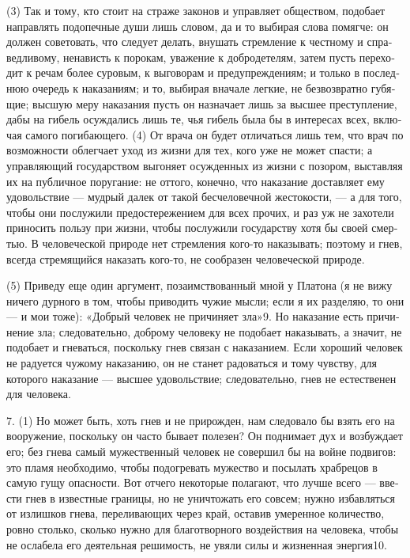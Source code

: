 (3) Так и тому, кто сто­ит на стра­же зако­нов и управ­ля­ет обще­ст­вом, подо­ба­ет направ­лять под­опеч­ные души лишь сло­вом, да и то выби­рая сло­ва помяг­че: он дол­жен сове­то­вать, что сле­ду­ет делать, вну­шать стрем­ле­ние к чест­но­му и спра­вед­ли­во­му, нена­висть к поро­кам, ува­же­ние к доб­ро­де­те­лям, затем пусть пере­хо­дит к речам более суро­вым, к выго­во­рам и пред­у­преж­де­ни­ям; и толь­ко в послед­нюю оче­редь к нака­за­ни­ям; и то, выби­рая вна­ча­ле лег­кие, не без­воз­врат­но губя­щие; выс­шую меру нака­за­ния пусть он назна­ча­ет лишь за выс­шее пре­ступ­ле­ние, дабы на гибель осуж­да­лись лишь те, чья гибель была бы в инте­ре­сах всех, вклю­чая само­го поги­баю­ще­го. (4) От вра­ча он будет отли­чать­ся лишь тем, что врач по воз­мож­но­сти облег­ча­ет уход из жиз­ни для тех, кого уже не может спа­сти; а управ­ля­ю­щий государ­ст­вом выго­ня­ет осуж­ден­ных из жиз­ни с позо­ром, выстав­ляя их на пуб­лич­ное пору­га­ние: не отто­го, конеч­но, что нака­за­ние достав­ля­ет ему удо­воль­ст­вие --- муд­рый далек от такой бес­че­ло­веч­ной жесто­ко­сти, --- а для того, чтобы они послу­жи­ли пре­до­сте­ре­же­ни­ем для всех про­чих, и раз уж не захо­те­ли при­но­сить поль­зу при жиз­ни, чтобы послу­жи­ли государ­ству хотя бы сво­ей смер­тью. В чело­ве­че­ской при­ро­де нет стрем­ле­ния кого-то нака­зы­вать; поэто­му и гнев, все­гда стре­мя­щий­ся нака­зать кого-то, не сооб­ра­зен чело­ве­че­ской при­ро­де.

(5) При­ве­ду еще один аргу­мент, поза­им­ст­во­ван­ный мной у Пла­то­на (я не вижу ниче­го дур­но­го в том, чтобы при­во­дить чужие мыс­ли; если я их разде­ляю, то они --- и мои тоже): «Доб­рый чело­век не при­чи­ня­ет зла»9. Но нака­за­ние есть при­чи­не­ние зла; сле­до­ва­тель­но, доб­ро­му чело­ве­ку не подо­ба­ет нака­зы­вать, а зна­чит, не подо­ба­ет и гне­вать­ся, посколь­ку гнев свя­зан с нака­за­ни­ем. Если хоро­ший чело­век не раду­ет­ся чужо­му нака­за­нию, он не станет радо­вать­ся и тому чув­ству, для кото­ро­го нака­за­ние --- выс­шее удо­воль­ст­вие; сле­до­ва­тель­но, гнев не есте­стве­нен для чело­ве­ка.

7. (1) Но может быть, хоть гнев и не при­рож­ден, нам сле­до­ва­ло бы взять его на воору­же­ние, посколь­ку он часто быва­ет поле­зен? Он под­ни­ма­ет дух и воз­буж­да­ет его; без гне­ва самый муже­ст­вен­ный чело­век не совер­шил бы на войне подви­гов: это пла­мя необ­хо­ди­мо, чтобы подо­гре­вать муже­ство и посы­лать храб­ре­цов в самую гущу опас­но­сти. Вот отче­го неко­то­рые пола­га­ют, что луч­ше все­го --- вве­сти гнев в извест­ные гра­ни­цы, но не уни­что­жать его совсем; нуж­но избав­лять­ся от излиш­ков гне­ва, пере­ли­ваю­щих через край, оста­вив уме­рен­ное коли­че­ство, ров­но столь­ко, сколь­ко нуж­но для бла­готвор­но­го воздей­ст­вия на чело­ве­ка, чтобы не осла­бе­ла его дея­тель­ная реши­мость, не увя­ли силы и жиз­нен­ная энергия10.

